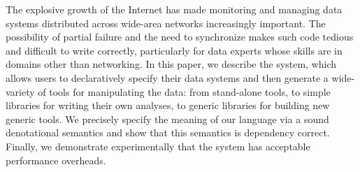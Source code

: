The explosive growth of the Internet has made monitoring and managing
data systems distributed across wide-area networks increasingly
important.  The possibility of partial failure and the need to
synchronize makes such code tedious and difficult to write correctly,
particularly for data experts whose skills are in domains other than
networking. In this paper, we describe the \padsd{} system, which
allows users to declaratively specify their data systems and then
generate a wide-variety of tools for manipulating the data: from
stand-alone tools, to simple libraries for writing their own analyses,
to generic libraries for building new generic tools.  We precisely
specify the meaning of our language via a sound denotational
semantics and show that this semantics is dependency correct. Finally,
we demonstrate experimentally that the system has
acceptable performance overheads.
